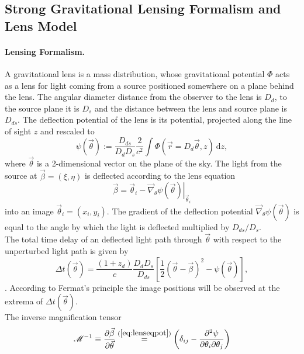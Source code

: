 \subsection{Strong Gravitational Lensing Formalism and Lens Model}

\paragraph{Lensing Formalism.} A gravitational lens is a mass distribution, whose gravitational potential $\Phi$ acts as a lens for light coming from a source positioned somewhere on a plane behind the lens. The angular diameter distance from the observer to the lens is $D_d$, to the source plane it is $D_s$ and the distance between the lens and source plane is $D_{ds}$. The deflection potential of the lens is its potential, projected along the line of sight $z$ and rescaled to
\begin{equation}
\psi(\vec{\theta}) := \frac{D_{ds}}{D_d D_s} \frac{2}{c^2} \int \Phi(\vec{r}=D_d \vec{\theta},z) {\ \mathrm d} z, \label{eq:psidef}
\end{equation}
where $\vec{\theta}$ is a 2-dimensional vector on the plane of the sky. The light from the source at $\vec{\beta} = (\xi,\eta)$ is deflected according to the lens equation
\begin{equation}
\vec{\beta} = \vec{\theta}_i - \left.\vec{\nabla}_\theta \psi(\vec{\theta})\right|_{\vec{\theta}_i} \label{eq:lenseqpot}
\end{equation}
into an image $\vec{\theta}_i = (x_i,y_i)$. The gradient of the deflection potential $\vec{\nabla}_\theta \psi(\vec{\theta})$ is equal to the angle by which the light is deflected multiplied by $D_{ds}/D_{s}$.
\\The total time delay of an deflected light path through $\vec{\theta}$ with respect to the unperturbed light path is given by 
\begin{equation}
\Delta t(\vec{\theta}) = \frac{(1+z_d)}{c} \frac{D_d D_s}{D_{ds}} \left[ \frac 12 (\vec{\theta} - \vec{\beta})^2 - \psi(\vec{\theta})\right], \label{eq:timedelay}
\end{equation}
\citep{BartGravLens}. According to Fermat's principle the image positions will be observed at the extrema of $\Delta t(\vec{\theta})$.
\\The inverse magnification tensor
\begin{equation}
\mathscr{M}^{-1} \equiv \frac{\partial \vec{\beta}}{\partial \vec{\theta}} \overset{(\ref{eq:lenseqpot})}{=} \left(\delta_{ij} - \frac{\partial^2 \psi}{\partial \theta_i \partial \theta_j} \right)\label{eq:magnificationtensor}
\end{equation}
